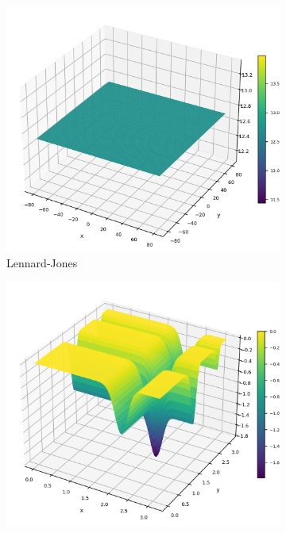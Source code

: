 \begin{figure}[p]\ContinuedFloat
\renewcommand\thesubfigure{A.\arabic{subfigure}} %
    \centering
    \begin{subfigure}{0.32\textwidth}
        \centering
        \includegraphics[width=1\textwidth]{Figures/benchmark_plots/Lennard_Jones_Minimum_Energy_Cluster_maximized.png}
        \caption{Lennard‑Jones}
    \end{subfigure}
    \begin{subfigure}{0.32\textwidth}
        \centering
        \includegraphics[width=1\textwidth]{Figures/benchmark_plots/Michalewicz_maximized.png}

\end{subfigure}
\end{figure}
